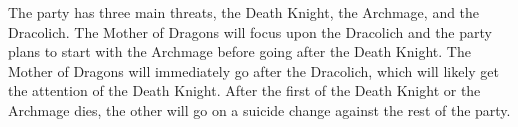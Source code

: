 The party has three main threats, the Death Knight, the Archmage, and the Dracolich.
The Mother of Dragons will focus upon the Dracolich and the party plans to start with the Archmage before going after the Death Knight.
The Mother of Dragons will immediately go after the Dracolich, which will likely get the attention of the Death Knight.
After the first of the Death Knight or the Archmage dies, the other will go on a suicide change against the rest of the party.